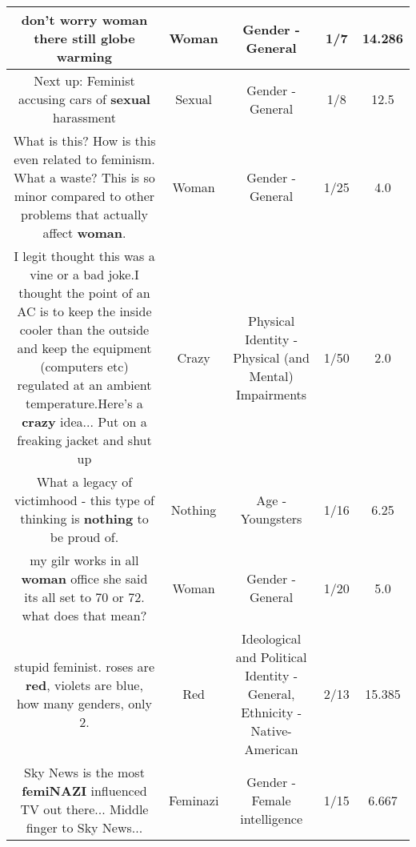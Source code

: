 \documentclass[11pt]{article}
\newlength\mylength
\begin{document}
\begin{center}
\begin{longtable}{|C{.65\mylength}|C{.30\mylength}|C{.12\mylength}|C{.12\mylength}|C{.12\mylength}|}
  \small don't worry \textbf{woman} there still globe warming\normalsize   & Woman & Gender - General & 1/7 & 14.286 \\  \hline
  \small Next up: Feminist accusing cars of \textbf{sexual} harassment\normalsize   & Sexual & Gender - General & 1/8 & 12.5 \\  \hline
  \small What is this? How is this even related to feminism. What a waste? This is so minor compared to other problems that actually affect \textbf{woman}.\normalsize   & Woman & Gender - General & 1/25 & 4.0 \\  \hline
  \small I legit thought this was a vine or a bad joke.I thought the point of an AC is to keep the inside cooler than the outside and keep the equipment (computers etc) regulated at an ambient temperature.Here's a \textbf{crazy} idea... Put on a freaking jacket and shut up\normalsize   & Crazy & Physical Identity - Physical (and Mental) Impairments & 1/50 & 2.0 \\  \hline
  \small What a legacy of victimhood - this type of thinking is \textbf{nothing} to be proud of.\normalsize   & Nothing & Age - Youngsters & 1/16 & 6.25 \\  \hline
  \small my gilr works in all \textbf{woman} office she said its all set to 70 or 72. what does that mean?\normalsize   & Woman & Gender - General & 1/20 & 5.0 \\  \hline
  \small stupid feminist. roses are \textbf{r\textbf{ed}}, violets are blue, how many genders, only 2.\normalsize   & Red &  Ideological and Political Identity - General, Ethnicity - Native-American & 2/13 & 15.385 \\  \hline
  \small Sky News is the most \textbf{femiNAZI} influenced TV out there... Middle finger to Sky News...\normalsize   & Feminazi & Gender - Female intelligence & 1/15 & 6.667 \\  \hline

\end{longtable}
\end{center}
\end{document}
